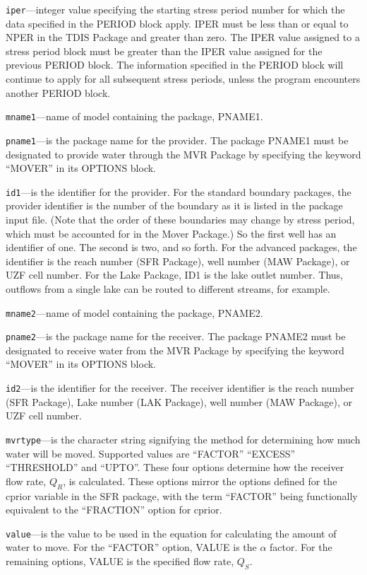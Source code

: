 \begin{description}
\item \texttt{iper}---integer value specifying the starting stress period number for which the data specified in the PERIOD block apply.  IPER must be less than or equal to NPER in the TDIS Package and greater than zero.  The IPER value assigned to a stress period block must be greater than the IPER value assigned for the previous PERIOD block.  The information specified in the PERIOD block will continue to apply for all subsequent stress periods, unless the program encounters another PERIOD block.

\item \texttt{mname1}---name of model containing the package, PNAME1.

\item \texttt{pname1}---is the package name for the provider.  The package PNAME1 must be designated to provide water through the MVR Package by specifying the keyword ``MOVER'' in its OPTIONS block.

\item \texttt{id1}---is the identifier for the provider.  For the standard boundary packages, the provider identifier is the number of the boundary as it is listed in the package input file. (Note that the order of these boundaries may change by stress period, which must be accounted for in the Mover Package.)  So the first well has an identifier of one.  The second is two, and so forth.  For the advanced packages, the identifier is the reach number (SFR Package), well number (MAW Package), or UZF cell number.  For the Lake Package, ID1 is the lake outlet number.  Thus, outflows from a single lake can be routed to different streams, for example.

\item \texttt{mname2}---name of model containing the package, PNAME2.

\item \texttt{pname2}---is the package name for the receiver.  The package PNAME2 must be designated to receive water from the MVR Package by specifying the keyword ``MOVER'' in its OPTIONS block.

\item \texttt{id2}---is the identifier for the receiver.  The receiver identifier is the reach number (SFR Package), Lake number (LAK Package), well number (MAW Package), or UZF cell number.

\item \texttt{mvrtype}---is the character string signifying the method for determining how much water will be moved.  Supported values are ``FACTOR'' ``EXCESS'' ``THRESHOLD'' and ``UPTO''.  These four options determine how the receiver flow rate, $Q_R$, is calculated.  These options mirror the options defined for the cprior variable in the SFR package, with the term ``FACTOR'' being functionally equivalent to the ``FRACTION'' option for cprior.

\item \texttt{value}---is the value to be used in the equation for calculating the amount of water to move.  For the ``FACTOR'' option, VALUE is the $\alpha$ factor.  For the remaining options, VALUE is the specified flow rate, $Q_S$.

\end{description}


